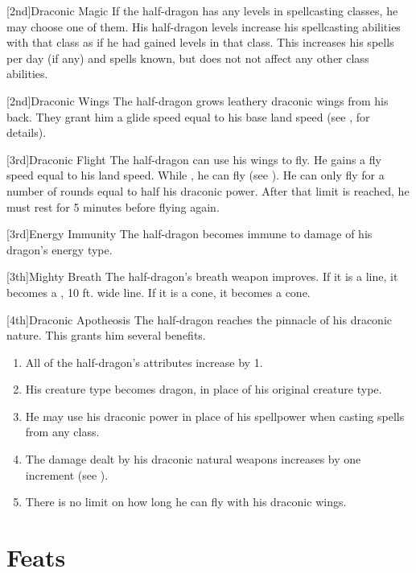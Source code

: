             [2nd]{Draconic Magic} If the half-dragon has any levels in spellcasting classes, he may choose one of them.
            His half-dragon levels increase his spellcasting abilities with that class as if he had gained levels in that class.
            This increases his spells per day (if any) and spells known, but does not not affect any other class abilities.

            [2nd]{Draconic Wings}
            The half-dragon grows leathery draconic wings from his back.
            They grant him a glide speed equal to his base land speed (see , for details).

            [3rd]{Draconic Flight}
            The half-dragon can use his wings to fly.
            He gains a fly speed equal to his land speed.
            While \unencumbered, he can fly (see ).
            He can only fly for a number of rounds equal to half his draconic power.
            After that limit is reached, he must rest for 5 minutes before flying again.

            [3rd]{Energy Immunity} The half-dragon becomes immune to damage of his dragon's energy type.

            [3th]{Mighty Breath}
            The half-dragon's breath weapon improves.
            If it is a line, it becomes a \areahuge, 10 ft. wide line.
            If it is a cone, it becomes a \arealarge cone.

            [4th]{Draconic Apotheosis}
            The half-dragon reaches the pinnacle of his draconic nature.
            This grants him several benefits.
            \begin{enumerate}
                \item All of the half-dragon's attributes increase by 1.
                \item His creature type becomes dragon, in place of his original creature type.
                \item He may use his draconic power in place of his spellpower when casting spells from any class.
                \item The damage dealt by his draconic natural weapons increases by one increment (see ).
                \item There is no limit on how long he can fly with his draconic wings.
            \end{enumerate}

\section{Feats}

